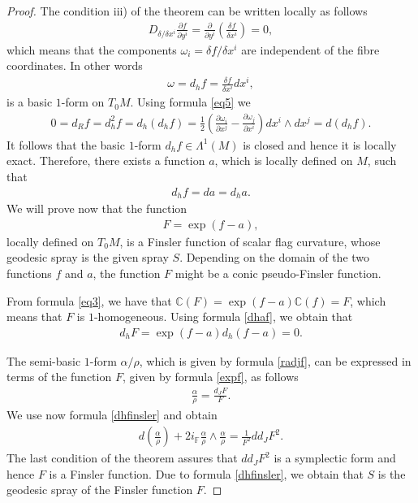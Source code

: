 \documentclass[oneside,english]{amsart}
\numberwithin{equation}{section}
\numberwithin{figure}{section}
\theoremstyle{plain}
\theoremstyle{plain}
\theoremstyle{definition}
\theoremstyle{plain}
\theoremstyle{plain}
\theoremstyle{plain}
\theoremstyle{remark}
\theoremstyle{remark}
\begin{document}
\begin{proof}
  The condition iii) of the theorem can be written locally as follows
  \begin{eqnarray}
    D_{\delta/\delta x^i}\frac{\partial f}{\partial y^i} =
    \frac{\partial}{\partial y^i} \left(\frac{\delta f}{\delta x^i}\right)
    = 0, \label{dpf} \end{eqnarray}
  which means that the components $\omega_i= \delta f/\delta x^i$ are independent of
  the fibre coordinates. In other words 
  \begin{eqnarray} \omega=d_hf=\frac{\delta f}{\delta
      x^i}dx^i, \label{eq9} \end{eqnarray}
  is a basic $1$-form on $T_0M$. Using formula \eqref{eq5} we 
  \begin{eqnarray}
    0=d_Rf=d^2_hf=d_h(d_h f) = \frac{1}{2}\left(\frac{\partial
        \omega_i}{\partial x^j} - \frac{\partial
        \omega_j}{\partial x^i} \right) dx^i\wedge
    dx^j=d(d_hf). \label{eq10} \end{eqnarray}
  It follows that the basic $1$-form $d_hf \in \Lambda^1(M)$ is
  closed and hence it is locally exact. Therefore, there exists a
  function $a$, which is locally defined on $M$, such that
  \begin{eqnarray}
    d_hf=da = d_ha. \label{dhaf} \end{eqnarray}
  We will prove now that the function 
  \begin{eqnarray}
    F=\exp(f-a),\label{expf} \end{eqnarray} locally defined on
  $T_0M$, is a Finsler function of scalar flag curvature, whose geodesic
  spray is the given spray $S$. Depending on the domain of
    the two functions $f$ and $a$, the function $F$ might be a conic
    pseudo-Finsler function.

  From formula \eqref{eq3}, we have that 
  $ \mathbb{C}(F)= \exp(f-a) \mathbb{C}(f)=F$, which means
  that $F$ is $1$-homogeneous. Using formula \eqref{dhaf}, we obtain that 
  \begin{eqnarray}
    d_hF= \exp(f-a) d_h(f-a)=0. \label{dhfinsler} \end{eqnarray}

  The semi-basic $1$-form $\alpha/\rho$, which is given by formula
  \eqref{radjf}, can be expressed in terms of the function $F$, given by
  formula \eqref{expf}, as follows 
  \begin{eqnarray*}
    \frac{\alpha}{\rho}=\frac{d_JF}{F}. \label{far} \end{eqnarray*}
  We use now formula \eqref{dhfinsler} and obtain
  \begin{eqnarray} d\left(\frac{\alpha}{\rho}\right)+ 2i_{\mathbb F}\frac{\alpha}{\rho} \wedge
    \frac{\alpha}{\rho} = \frac{1}{F^2}
    dd_JF^2. \label{symplectic} \end{eqnarray} The last condition of the 
  theorem assures that $dd_JF^2$ is a symplectic form and hence $F$ is a
  Finsler function.
  Due to formula \eqref{dhfinsler}, we obtain that $S$ is the geodesic
  spray of the Finsler function $F$. 


\end{proof}
\end{document}

